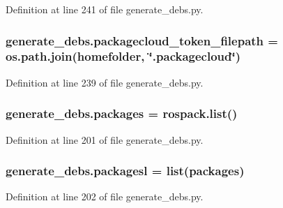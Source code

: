 Definition at line 241 of file generate\+\_\+debs.\+py.

\subsubsection[{\texorpdfstring{packagecloud\+\_\+token\+\_\+filepath}{packagecloud_token_filepath}}]{\setlength{\rightskip}{0pt plus 5cm}generate\+\_\+debs.\+packagecloud\+\_\+token\+\_\+filepath = os.\+path.\+join({\bf homefolder}, \char`\"{}.packagecloud\char`\"{})}\hypertarget{namespacegenerate__debs_a836a20b989c3c8e46255d91d10cb524f}{}\label{namespacegenerate__debs_a836a20b989c3c8e46255d91d10cb524f}


Definition at line 239 of file generate\+\_\+debs.\+py.

\subsubsection[{\texorpdfstring{packages}{packages}}]{\setlength{\rightskip}{0pt plus 5cm}generate\+\_\+debs.\+packages = rospack.\+list()}\hypertarget{namespacegenerate__debs_a40d4732827c5678f3f48354238245e1d}{}\label{namespacegenerate__debs_a40d4732827c5678f3f48354238245e1d}


Definition at line 201 of file generate\+\_\+debs.\+py.

\subsubsection[{\texorpdfstring{packagesl}{packagesl}}]{\setlength{\rightskip}{0pt plus 5cm}generate\+\_\+debs.\+packagesl = list({\bf packages})}\hypertarget{namespacegenerate__debs_acac340506bc1d8ca0d0881b9c00bfea2}{}\label{namespacegenerate__debs_acac340506bc1d8ca0d0881b9c00bfea2}


Definition at line 202 of file generate\+\_\+debs.\+py.

